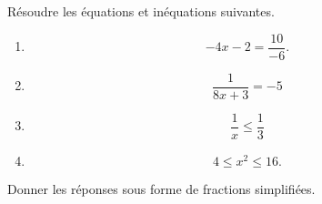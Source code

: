 
\begin{exercice}\label{exosmath-0346}

    Résoudre les équations et inéquations suivantes.
    \begin{multicols}{2}
    \begin{enumerate}
        \item
            \begin{equation}
                -4x-2=\frac{ 10 }{ -6 }.
            \end{equation}
        \item
            \begin{equation}
                \frac{ 1 }{ 8x+3 }=-5
            \end{equation}
        \item
            \begin{equation}
                \frac{ 1 }{ x }\leq\frac{ 1 }{ 3 }
            \end{equation}
        \item
            \begin{equation}
                4\leq x^2\leq 16.
            \end{equation}
    \end{enumerate}
    \end{multicols}
    Donner les réponses sous forme de fractions simplifiées.

\end{exercice}

